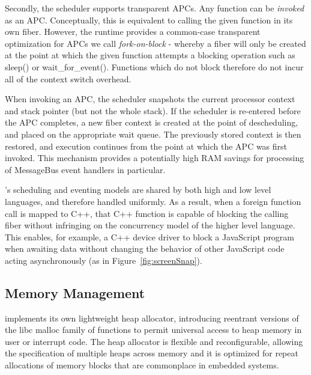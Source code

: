 Secondly, the \CO scheduler supports transparent APCs. Any function can be \emph{invoked} as an APC. Conceptually, this is equivalent to calling the given function in its own fiber. However, the \CO runtime provides a common-case transparent optimization for APCs we call \emph{fork-on-block} - whereby a fiber will only be created at the point at which the given function attempts a blocking operation such as sleep() or wait\_for\_event(). Functions which do not block therefore do not incur all of the context switch overhead.

When invoking an APC, the scheduler snapshots the current processor context and stack pointer (but not the whole stack). If the scheduler is re-entered before the APC completes, a new fiber context is created at the point of descheduling, and placed on the appropriate wait queue. The previously stored context is then restored, and execution continues from the point at which the APC was first invoked. This mechanism provides a potentially high RAM savings for processing of MessageBus event handlers in particular.

\CON's scheduling and eventing models are shared by both high and low level languages, and therefore handled uniformly. As a result, when a foreign function call is mapped to C++, that C++ function is capable of blocking the calling fiber without infringing on the concurrency model of the higher level language. This enables, for example, a C++ device driver to block a JavaScript program when awaiting data without changing the behavior of other JavaScript code acting asynchronously (as in Figure~\ref{fig:screenSnap}).


\subsection{Memory Management}
\CO implements its own lightweight heap allocator, introducing reentrant versions of the libc malloc family of functions to permit universal access to heap memory in user or interrupt code. The heap allocator is flexible and reconfigurable, allowing the specification of multiple heaps across memory and it is optimized for repeat allocations of memory blocks that are commonplace in embedded systems.

